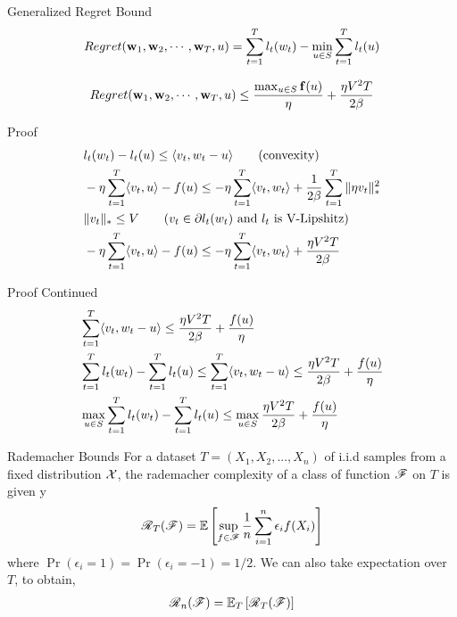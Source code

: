 \begin{frame}{Generalized Regret Bound}
  \begin{align*}
    Regret(\operatorname{\mathbf{w}}_1,\operatorname{\mathbf{w}}_2,\cdots,\operatorname{\mathbf{w}}_T,u) = \sum_{t=1}^T l_t(w_t) - \min_{u \in S} \sum_{t=1}^T l_t(u)
  \end{align*}
  \begin{theorem}
    \begin{align*}    
      Regret(\operatorname{\mathbf{w}}_1,\operatorname{\mathbf{w}}_2,\cdots,\operatorname{\mathbf{w}}_T,u) \le \frac{\max_{u \in S} \operatorname{\mathbf{f}}(u)}{\eta} + \frac{\eta V^2T}{2\beta}
    \end{align*}  
  \end{theorem}
\end{frame}

\begin{frame}{Proof}
    \begin{align*}    
      & l_t(w_t) - l_t(u) \le \langle {v_t} , {w_t - u} \rangle \tag{convexity} \\
      & -\eta\sum_{t=1}^T \langle {v_t} , {u} \rangle -f(u) \le -\eta\sum_{t=1}^T \langle {v_t} , {w_t} \rangle +\frac{1}{2\beta} \sum_{t=1}^T \|\eta v_t\|_{*}^2 \\
      & \|v_t\|_{*} \le V \tag{$v_t \in \partial l_t(w_t)$ and $l_t$ is V-Lipshitz} \\
      & -\eta\sum_{t=1}^T \langle {v_t} , {u} \rangle -f(u) \le -\eta\sum_{t=1}^T \langle {v_t} , {w_t} \rangle +\frac{\eta V^2T}{2\beta} \\
    \end{align*}
\end{frame}

\begin{frame}{Proof Continued}
    \begin{align*}    
      & \sum_{t=1}^T \langle {v_t} , {w_t - u} \rangle \le \frac{\eta V^2T}{2\beta} + \frac{f(u)}{\eta} \\
      & \sum_{t=1}^T l_t(w_t) - \sum_{t=1}^T l_t(u) \le \sum_{t=1}^T \langle {v_t} , {w_t - u} \rangle \le \frac{\eta V^2T}{2\beta} + \frac{f(u)}{\eta} \\
      & \max_{u \in S} \sum_{t=1}^T l_t(w_t) - \sum_{t=1}^T l_t(u) \le \max_{u \in S} \frac{\eta V^2T}{2\beta} + \frac{f(u)}{\eta}
    \end{align*}  
\end{frame}


\begin{frame}{Rademacher Bounds}
  For a dataset $T=(X_1,X_2,...,X_n)$ of i.i.d samples from a fixed distribution $\operatorname{\mathcal{X}}$, the rademacher complexity of a class of function $\operatorname{\mathscr{F}}$ on $T$ is given y
  \begin{align*}
    \operatorname{\mathscr{R}}_T(\operatorname{\mathscr{F}}) = \operatorname{\mathbb{E}} \left[ \sup_{f \in \operatorname{\mathscr{F}}} \frac{1}{n}\sum_{i=1}^n \epsilon_i f(X_i) \right]
  \end{align*}
  where $\Pr(\epsilon_i = 1) = \Pr(\epsilon_i = -1) = 1/2$.
  We can also take expectation over $T$, to obtain,
  \begin{align*}
    \operatorname{\mathscr{R}}_n(\operatorname{\mathscr{F}})=\operatorname{\mathbb{E}}_{T}\left[\operatorname{\mathscr{R}}_T(\operatorname{\mathscr{F}})\right]
  \end{align*}
\end{frame}

